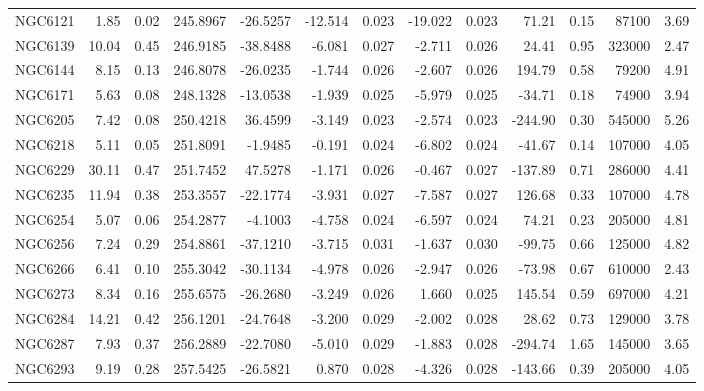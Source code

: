 \begin{longtable}{ | l | r | r| r | r | r | r | r | r | r | r | r | r  |}
            NGC6121       &   1.85 & 0.02 & 245.8967 & -26.5257 & -12.514 & 0.023 & -19.022 &  0.023 &   71.21 &  0.15 &   87100 &  3.69\\ 
            NGC6139       &  10.04 & 0.45 & 246.9185 & -38.8488 &  -6.081 & 0.027 &  -2.711 &  0.026 &   24.41 &  0.95 &  323000 &  2.47\\ 
            NGC6144       &   8.15 & 0.13 & 246.8078 & -26.0235 &  -1.744 & 0.026 &  -2.607 &  0.026 &  194.79 &  0.58 &   79200 &  4.91\\ 
            NGC6171       &   5.63 & 0.08 & 248.1328 & -13.0538 &  -1.939 & 0.025 &  -5.979 &  0.025 &  -34.71 &  0.18 &   74900 &  3.94\\ 
            NGC6205       &   7.42 & 0.08 & 250.4218 &  36.4599 &  -3.149 & 0.023 &  -2.574 &  0.023 & -244.90 &  0.30 &  545000 &  5.26\\ 
            NGC6218       &   5.11 & 0.05 & 251.8091 &  -1.9485 &  -0.191 & 0.024 &  -6.802 &  0.024 &  -41.67 &  0.14 &  107000 &  4.05\\ 
            NGC6229       &  30.11 & 0.47 & 251.7452 &  47.5278 &  -1.171 & 0.026 &  -0.467 &  0.027 & -137.89 &  0.71 &  286000 &  4.41\\ 
            NGC6235       &  11.94 & 0.38 & 253.3557 & -22.1774 &  -3.931 & 0.027 &  -7.587 &  0.027 &  126.68 &  0.33 &  107000 &  4.78\\ 
            NGC6254       &   5.07 & 0.06 & 254.2877 &  -4.1003 &  -4.758 & 0.024 &  -6.597 &  0.024 &   74.21 &  0.23 &  205000 &  4.81\\ 
            NGC6256       &   7.24 & 0.29 & 254.8861 & -37.1210 &  -3.715 & 0.031 &  -1.637 &  0.030 &  -99.75 &  0.66 &  125000 &  4.82\\ 
            NGC6266       &   6.41 & 0.10 & 255.3042 & -30.1134 &  -4.978 & 0.026 &  -2.947 &  0.026 &  -73.98 &  0.67 &  610000 &  2.43\\ 
            NGC6273       &   8.34 & 0.16 & 255.6575 & -26.2680 &  -3.249 & 0.026 &   1.660 &  0.025 &  145.54 &  0.59 &  697000 &  4.21\\ 
            NGC6284       &  14.21 & 0.42 & 256.1201 & -24.7648 &  -3.200 & 0.029 &  -2.002 &  0.028 &   28.62 &  0.73 &  129000 &  3.78\\ 
            NGC6287       &   7.93 & 0.37 & 256.2889 & -22.7080 &  -5.010 & 0.029 &  -1.883 &  0.028 & -294.74 &  1.65 &  145000 &  3.65\\ 
            NGC6293       &   9.19 & 0.28 & 257.5425 & -26.5821 &   0.870 & 0.028 &  -4.326 &  0.028 & -143.66 &  0.39 &  205000 &  4.05\\ 

\end{longtable}
